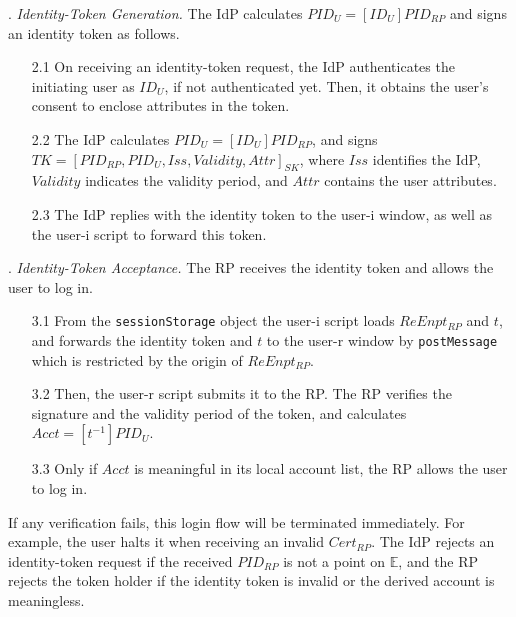 . {\em Identity-Token Generation.}
The IdP calculates $PID_U = [ID_U]{PID_{RP}}$ and signs an identity token as follows. %
\begin{itemize}
\setlength{\topsep}{0pt}
\setlength{\partopsep}{0pt}
\setlength{\itemsep}{0pt}
\setlength{\parsep}{0pt}
\setlength{\parskip}{0pt}
\item[2.1]
On receiving an identity-token request,
the IdP authenticates the initiating user as $ID_U$, if not authenticated yet.
Then, it obtains the user's consent to enclose attributes in the token.
\item[2.2]
The IdP calculates $PID_U = [ID_U]{PID_{RP}}$, and signs $TK = [PID_{RP}, PID_U, Iss, Validity, Attr]_{SK}$,
where $Iss$ identifies the IdP, $Validity$ indicates the validity period, and $Attr$ contains the user attributes.
\item[2.3] The IdP replies with the identity token to the user-i window,
    as well as the user-i script to forward this token.
\end{itemize}


. {\em Identity-Token Acceptance.}
The RP receives the identity token and allows the user to log in.
\begin{itemize}
\setlength{\topsep}{0pt}
\setlength{\partopsep}{0pt}
\setlength{\itemsep}{0pt}
\setlength{\parsep}{0pt}
\setlength{\parskip}{0pt}
\item [3.1]
From the \verb+sessionStorage+ object
the user-i script loads $ReEnpt_{RP}$ and $t$, 
    and forwards the identity token and $t$ to the user-r window by \verb+postMessage+ which is restricted by the origin of $ReEnpt_{RP}$.
\item[3.2] Then, the user-r script submits it to the RP.
The RP verifies the signature and the validity period of the token, 
and calculates $Acct = [t^{-1}]{PID_U}$.

\item[3.3] Only if $Acct$ is meaningful in its local account list, the RP allows the user to log in.

\end{itemize}

If any verification fails, this login flow will be terminated immediately.
For example, the user halts it when receiving an invalid $Cert_{RP}$.
The IdP rejects an identity-token request if the received $PID_{RP}$ is not a point on $\mathbb{E}$, and the RP rejects the token holder if the identity token is invalid or the derived account is meaningless. 

